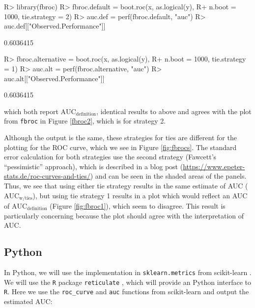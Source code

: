 \documentclass[12pt]{article}
\newcommand{\pkg}[1]{{\fontseries{b}\selectfont #1}}
\newenvironment{CodeChunk}{}{}
\begin{document}
\begin{CodeChunk}

\begin{CodeInput}
R> library(fbroc)
R> fbroc.default = boot.roc(x, as.logical(y), 
R+                          n.boot = 1000, tie.strategy = 2)
R> auc.def = perf(fbroc.default, "auc")
R> auc.def[["Observed.Performance"]]
\end{CodeInput}

\begin{CodeOutput}
[1] 0.6036415
\end{CodeOutput}

\begin{CodeInput}
R> fbroc.alternative = boot.roc(x, as.logical(y), 
R+                              n.boot = 1000, tie.strategy = 1)
R> auc.alt = perf(fbroc.alternative, "auc")
R> auc.alt[["Observed.Performance"]]
\end{CodeInput}

\begin{CodeOutput}
[1] 0.6036415
\end{CodeOutput}
\end{CodeChunk}

which both report \(\text{AUC}_{\text{definition}}\), identical results
to above and agrees with the plot from \texttt{fbroc} in Figure
\ref{fbroc2}, which is for strategy 2.

Although the output is the same, these strategies for ties are different
for the plotting for the ROC curve, which we see in Figure
\ref{fig:fbrocs}. The standard error calculation for both strategies use
the second strategy (Fawcett's ``pessimistic'' approach), which is
described in a blog post
(\url{https://www.epeter-stats.de/roc-curves-and-ties/}) and can be seen
in the shaded areas of the panels. Thus, we see that using either tie
strategy results in the same estimate of AUC
(\(\text{AUC}_{\text{w/ties}}\)), but using tie strategy 1 results in a
plot which would reflect an AUC of \(\text{AUC}_{\text{definition}}\)
(Figure \ref{fig:fbroc1}), which seem to disagree. This result is
particularly concerning because the plot should agree with the
interpretation of AUC.

\hypertarget{python}{%
\subsection{Python}\label{python}}

In Python, we will use the implementation in \texttt{sklearn.metrics}
from \pkg{scikit-learn} \citep{scikitlearn}. We will use the \texttt{R}
package \texttt{reticulate} \citep{reticulate}, which will provide an
Python interface to \texttt{R}. Here we use the \texttt{roc\_curve} and
\texttt{auc} functions from \pkg{scikit-learn} and output the estimated
AUC:
\end{document}
